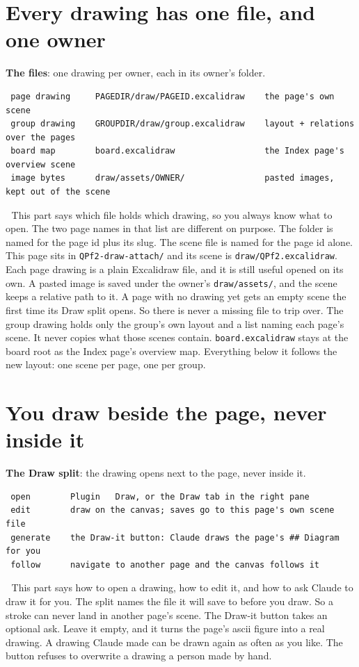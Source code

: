 
\section{Every drawing has one file, and one owner}
\textbf{The files}: one drawing per owner, each in its owner's folder.

\begin{verbatim}
 page drawing     PAGEDIR/draw/PAGEID.excalidraw    the page's own scene
 group drawing    GROUPDIR/draw/group.excalidraw    layout + relations over the pages
 board map        board.excalidraw                  the Index page's overview scene
 image bytes      draw/assets/OWNER/                pasted images, kept out of the scene
\end{verbatim}
📌 This part says which file holds which drawing, so you always know what to open. The two page names in that list are different on purpose. The folder is named for the page id plus its slug. The scene file is named for the page id alone. This page sits in \texttt{QPf2-draw-attach/} and its scene is \texttt{draw/QPf2.excalidraw}. Each page drawing is a plain Excalidraw file, and it is still useful opened on its own. A pasted image is saved under the owner's \texttt{draw/assets/}, and the scene keeps a relative path to it. A page with no drawing yet gets an empty scene the first time its Draw split opens. So there is never a missing file to trip over. The group drawing holds only the group's own layout and a list naming each page's scene. It never copies what those scenes contain. \texttt{board.excalidraw} stays at the board root as the Index page's overview map. Everything below it follows the new layout: one scene per page, one per group.


\section{You draw beside the page, never inside it}
\textbf{The Draw split}: the drawing opens next to the page, never inside it.

\begin{verbatim}
 open        Plugin   Draw, or the Draw tab in the right pane
 edit        draw on the canvas; saves go to this page's own scene file
 generate    the Draw-it button: Claude draws the page's ## Diagram for you
 follow      navigate to another page and the canvas follows it
\end{verbatim}
📌 This part says how to open a drawing, how to edit it, and how to ask Claude to draw it for you. The split names the file it will save to before you draw. So a stroke can never land in another page's scene. The Draw-it button takes an optional ask. Leave it empty, and it turns the page's ascii figure into a real drawing. A drawing Claude made can be drawn again as often as you like. The button refuses to overwrite a drawing a person made by hand.


